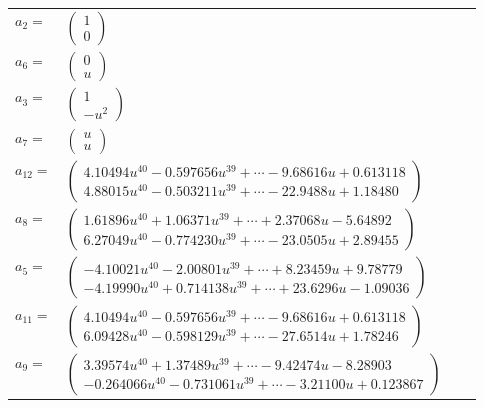 \documentclass[1p]{elsarticle_modified}
\theoremstyle{definition}
\begin{document}
\begin{tabular}{m{7pt} m{180pt} m{7pt} m{180pt} }
\flushright $a_{2}=$&$\begin{pmatrix}1\\0\end{pmatrix}$ \\
\flushright $a_{6}=$&$\begin{pmatrix}0\\u\end{pmatrix}$ \\
\flushright $a_{3}=$&$\begin{pmatrix}1\\- u^2\end{pmatrix}$ \\
\flushright $a_{7}=$&$\begin{pmatrix}u\\u\end{pmatrix}$ \\
\flushright $a_{12}=$&$\begin{pmatrix}4.10494 u^{40}-0.597656 u^{39}+\cdots-9.68616 u+0.613118\\4.88015 u^{40}-0.503211 u^{39}+\cdots-22.9488 u+1.18480\end{pmatrix}$ \\
\flushright $a_{8}=$&$\begin{pmatrix}1.61896 u^{40}+1.06371 u^{39}+\cdots+2.37068 u-5.64892\\6.27049 u^{40}-0.774230 u^{39}+\cdots-23.0505 u+2.89455\end{pmatrix}$ \\
\flushright $a_{5}=$&$\begin{pmatrix}-4.10021 u^{40}-2.00801 u^{39}+\cdots+8.23459 u+9.78779\\-4.19990 u^{40}+0.714138 u^{39}+\cdots+23.6296 u-1.09036\end{pmatrix}$ \\
\flushright $a_{11}=$&$\begin{pmatrix}4.10494 u^{40}-0.597656 u^{39}+\cdots-9.68616 u+0.613118\\6.09428 u^{40}-0.598129 u^{39}+\cdots-27.6514 u+1.78246\end{pmatrix}$ \\
\flushright $a_{9}=$&$\begin{pmatrix}3.39574 u^{40}+1.37489 u^{39}+\cdots-9.42474 u-8.28903\\-0.264066 u^{40}-0.731061 u^{39}+\cdots-3.21100 u+0.123867\end{pmatrix}$ \\

\end{tabular}
\end{document}
